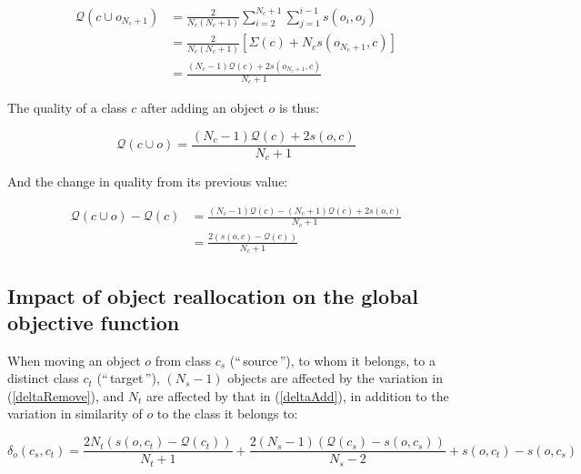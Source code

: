 \documentclass[a4paper,twoside]{article}
\newcommand{\gl}[1]{``\,#1\,''} %
\begin{document}
\begin{equation}
  \begin{aligned}
    \mathcal{Q}(c \cup o_{N_c+1}) & = \frac{2}{N_c(N_c+1)} \sum_{i=2}^{N_c+1} \sum_{j=1}^{i-1} s\left(o_i, o_j\right) \\
                                & = \frac{2}{N_c(N_c+1)} \left[\Sigma(c) + N_c s\left(o_{N_c+1}, c\right)\right] \\
                                & = \frac{(N_c-1) \mathcal{Q}(c)  + 2s\left(o_{N_c+1}, c\right)}{N_c+1}
  \end{aligned}
\end{equation}

The quality of a class $c$ after adding an object $o$ is thus:

\begin{equation}
  \mathcal{Q}\left(c \cup o\right) = \frac{(N_c-1) \mathcal{Q}(c)  + 2s\left(o, c\right)}{N_c+1}
  \label{eq:newQual_add}
\end{equation}

And the change in quality from its previous value:

\begin{equation} \label{deltaAdd}
  \begin{aligned}
    \mathcal{Q}\left(c \cup o\right) - \mathcal{Q}\left(c\right) & = \frac{(N_c-1) \mathcal{Q}(c)  - (N_c+1) \mathcal{Q}(c)  + 2s\left(o, c\right)}{N_c+1} \\
                                                                           & = \frac{2\left(s\left(o, c\right)-\mathcal{Q}(c)\right)}{N_c+1}
    \end{aligned}
\end{equation}


\subsection{Impact of object reallocation on the global objective function}

When moving an object $o$ from class $c_s$ (\gl{source}), to whom it belongs, to a
distinct class $c_t$ (\gl{target}), $(N_s-1)$ objects are affected
by the variation in (\ref{deltaRemove}), and $N_t$ are affected
by that in (\ref{deltaAdd}), in addition to the variation in similarity
of $o$ to the class it belongs to:

\begin{equation}
  \delta_o(c_s, c_t) = \frac{2N_t \left(s\left(o, c_t\right)-\mathcal{Q}(c_t)\right)}{N_t+1} + \frac{2(N_s-1)\left( \mathcal{Q}(c_s) - s\left(o, c_s\right)\right)}{N_s-2} + s(o,c_t) - s(o,c_s)
  \label{eq:impact_classnorm}
\end{equation}
\end{document}
